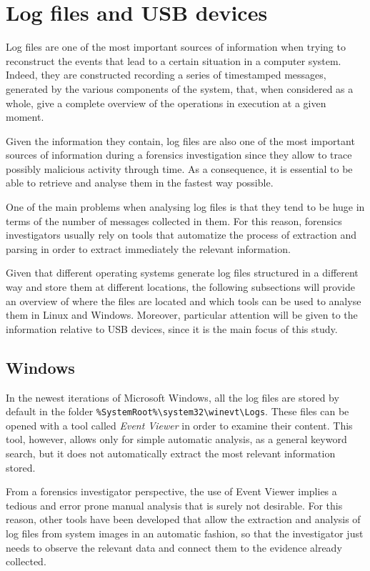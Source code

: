 \documentclass[a4paper]{article}
\begin{document}
\section{Log files and USB devices}
\label{sec:lit}
Log files are one of the most important sources of information when trying to
reconstruct the events that lead to a certain situation in a computer system.
Indeed, they are constructed recording a series of timestamped messages,
generated by the various components of the system, that, when considered as a
whole, give a complete overview of the operations in execution at a given
moment.

Given the information they contain, log files are also one of the most important
sources of information during a forensics investigation since they allow to
trace possibly malicious activity through time. As a consequence, it is
essential to be able to retrieve and analyse them in the fastest way
possible.~\cite{finlayson1987log}

One of the main problems when analysing log files is that they tend to be huge
in terms of the number of messages collected in them. For this reason, forensics
investigators usually rely on tools that automatize the process of extraction
and parsing in order to extract immediately the relevant information.

Given that different operating systems generate log files structured in a
different way and store them at different locations, the following subsections
will provide an overview of where the files are located and which tools can
be used to analyse them in Linux and Windows. Moreover, particular attention
will be given to the information relative to USB devices, since it is the main
focus of this study.

\subsection{Windows}\label{sec:litWindows}
In the newest iterations of Microsoft Windows, all the log files are stored by
default in the folder
\texttt{\%SystemRoot\%\textbackslash{}system32\textbackslash{}winevt\textbackslash{}Logs}.
These files can be opened with a tool called \emph{Event Viewer} in order to
examine their content. This tool, however, allows only for simple automatic
analysis, as a general keyword search, but it does not automatically extract
the most relevant information stored.

From a forensics investigator perspective, the use of Event Viewer implies a
tedious and error prone manual analysis that is surely not desirable. For this
reason, other tools have been developed that allow the extraction and analysis
of log files from system images in an automatic fashion, so that the
investigator just needs to observe the relevant data and connect them to the
evidence already collected.
\end{document}
